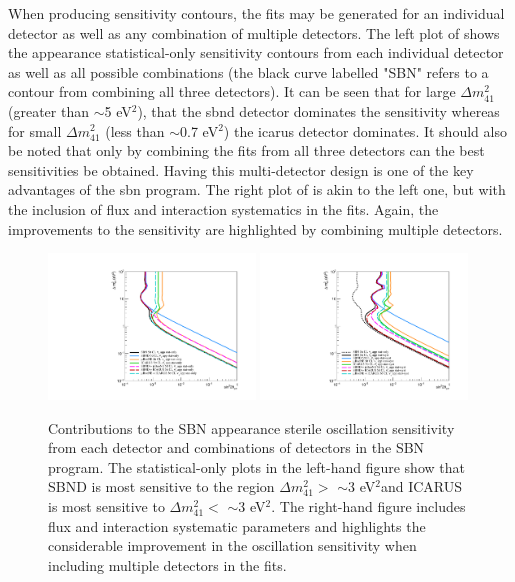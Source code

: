 When producing sensitivity contours, the fits may be generated for an individual detector as well as any combination of multiple detectors. The left plot of  shows the \nue appearance statistical-only sensitivity contours from each individual detector as well as all possible combinations (the black curve labelled "SBN" refers to a contour from combining all three detectors). It can be seen that for large $\Delta m^2_{41}$ (greater than $\sim$5 eV$^2$), that the \gls{sbnd} detector dominates the sensitivity whereas for small $\Delta m^2_{41}$ (less than $\sim$0.7 eV$^2$) the \gls{icarus} detector dominates. It should also be noted that only by combining the fits from all three detectors can the best sensitivities be obtained. Having this multi-detector design is one of the key advantages of the \gls{sbn} program. The right plot of  is akin to the left one, but with the inclusion of flux and interaction systematics in the fits. Again, the improvements to the sensitivity are highlighted by combining multiple detectors. 

\begin{figure}[h!]
    \centering
    \includegraphics[width = 0.49\textwidth]{figures-chap6/exclusion_contours/nue_app_detector_combinations_stat_only.pdf}
    \includegraphics[width = 0.49\textwidth]{figures-chap6/exclusion_contours/nue_app_detector_combinations_stat+syst.pdf}
    \caption[\nue appearance sensitivities from different detector combinations.]{Contributions to the SBN \nue appearance sterile oscillation sensitivity from each detector and combinations of detectors in the SBN program. The statistical-only plots in the left-hand figure show that SBND is most sensitive to the region $\Delta m_{41}^{2} >$ $\sim$3 eV$^{2}$and ICARUS is most sensitive to $\Delta m_{41}^{2} <$ $\sim$3 eV$^{2}$. The right-hand figure includes flux and interaction systematic parameters and highlights the considerable improvement in the oscillation sensitivity when including multiple detectors in the fits.}
    \label{fig:nue_sensitivity_detector_contribution}
\end{figure}

